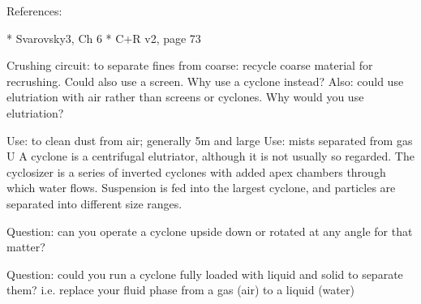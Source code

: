 References:

* Svarovsky3, Ch 6
* C+R v2, page 73


Crushing circuit: to separate fines from coarse: recycle coarse material for recrushing. Could also use a screen. Why use a cyclone instead?
Also: could use elutriation with air rather than screens or cyclones. Why would you use elutriation?

Use: to clean dust from air; generally 5\mu m and large
Use: mists separated from gas
U
A cyclone is a centrifugal elutriator, although it is not usually so regarded. The cyclosizer is a series of inverted cyclones with added apex chambers through which water flows. Suspension is fed into the largest cyclone, and particles are separated into different size ranges.

Question: can you operate a cyclone upside down or rotated at any angle for that matter?

Question: could you run a cyclone fully loaded with liquid and solid to separate them? i.e. replace your fluid phase from a gas (air) to a liquid (water)


